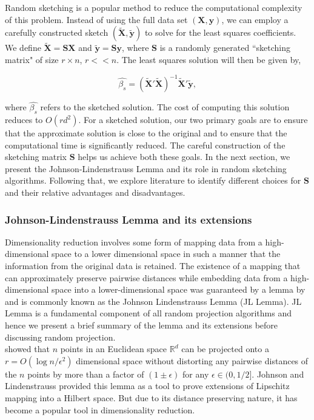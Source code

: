 Random sketching is a popular method to reduce the computational complexity of this problem.  Instead of using the full data set $(\textbf{X}, \textbf{y})$, we can employ a carefully constructed sketch $(\tilde{\textbf{X}},\tilde{\textbf{y}})$ to solve for the least squares coefficients. We define $\tilde{\textbf{X}} = \textbf{S}\textbf{X}$ and $\tilde{\textbf{y}}= \textbf{S}\textbf{y}$, where $\textbf{S}$ is a randomly generated ``sketching matrix" of size $r \times n$, $r << n$. The least squares solution will then be given by, 

\begin{equation*}
\hat{\beta_s} = (\tilde{\textbf{X}}'\tilde{\textbf{X}})^{-1} \tilde{\textbf{X}}'\tilde{\textbf{y}},
\end{equation*}

\noindent where $\hat{\beta_s}$ refers to the sketched solution. The cost of computing this solution reduces to $O(rd^2)$. For a sketched solution, our two primary goals are to ensure that the approximate solution is close to the original and to ensure that the computational time is significantly reduced. The careful construction of the sketching matrix $\textbf{S}$ helps us achieve both these goals. In the next section, we present the Johnson-Lindenstrauss Lemma and its role in random sketching algorithms. Following that, we explore literature to identify different choices for $\textbf{S}$ and their relative advantages and disadvantages.  \\

\subsubsection{Johnson-Lindenstrauss Lemma and its extensions}

Dimensionality reduction involves some form of mapping data from a high-dimensional space to a lower dimensional space in such a manner that the information from the original data is retained. The existence of a mapping that can approximately preserve pairwise distances while embedding data from a high-dimensional space into a lower-dimensional space was guaranteed by a lemma by \cite{JL1984} and is commonly known as the Johnson Lindenstrauss Lemma (JL Lemma). JL Lemma is a fundamental component of all random projection algorithms and hence we present a brief summary of the lemma and its extensions before discussing random projection. \\

\cite{JL1984} showed that $n$ points in an Euclidean space $\mathds{R}^d$ can be projected onto a $r= O(\log n /\epsilon^2)$ dimensional space without distorting any pairwise distances of the $n$ points by more than a factor of $(1\pm\epsilon)$ for any $\epsilon \in (0, 1/2]$. Johnson and Lindenstrauss provided this lemma as a tool to prove extensions of Lipschitz mapping into a Hilbert space. But due to its distance preserving nature, it has become a popular tool in dimensionality reduction. \\

